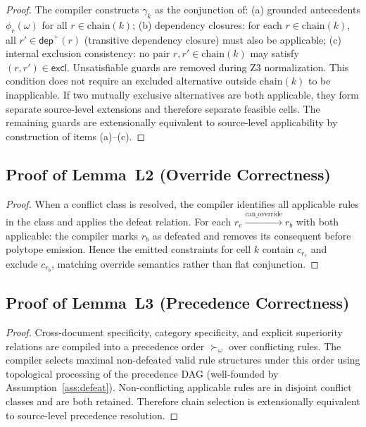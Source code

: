 ﻿\documentclass[a4paper,fleqn]{cas-dc}
\newcommand{\chain}{\mathrm{chain}}
\begin{document}
\begin{proof}
The compiler constructs $\gamma_k$ as the conjunction of:
(a) grounded antecedents $\phi_r(\omega)$ for all $r\in\chain(k)$;
(b) dependency closures: for each $r\in\chain(k)$, all $r'\in\textsf{dep}^+(r)$
    (transitive dependency closure) must also be applicable;
(c) internal exclusion consistency: no pair $r,r'\in\chain(k)$ may satisfy
    $(r,r')\in\textsf{excl}$.
Unsatisfiable guards are removed during Z3 normalization.
This condition does not require an excluded alternative outside $\chain(k)$ to
be inapplicable. If two mutually exclusive alternatives are both applicable,
they form separate source-level extensions and therefore separate feasible
cells. The remaining guards are extensionally equivalent to source-level
applicability by construction of items (a)--(c).  
\end{proof}

\subsection{Proof of Lemma~L2 (Override Correctness)}

\begin{proof}
When a conflict class is resolved, the compiler identifies all applicable rules
in the class and applies the defeat relation.
For each $r_e \xrightarrow{\text{can\_override}} r_b$ with both applicable:
the compiler marks $r_b$ as defeated and removes its consequent before polytope emission.
Hence the emitted constraints for cell $k$ contain $c_{r_e}$ and exclude $c_{r_b}$,
matching override semantics rather than flat conjunction.  
\end{proof}

\subsection{Proof of Lemma~L3 (Precedence Correctness)}

\begin{proof}
Cross-document specificity, category specificity, and explicit superiority relations
are compiled into a precedence order $\succ_\omega$ over conflicting rules.
The compiler selects maximal non-defeated valid rule structures under this order using topological
processing of the precedence DAG (well-founded by Assumption~\ref{ass:defeat}).
Non-conflicting applicable rules are in disjoint conflict classes and are both retained.
Therefore chain selection is extensionally equivalent to source-level precedence resolution.  
\end{proof}
\end{document}
